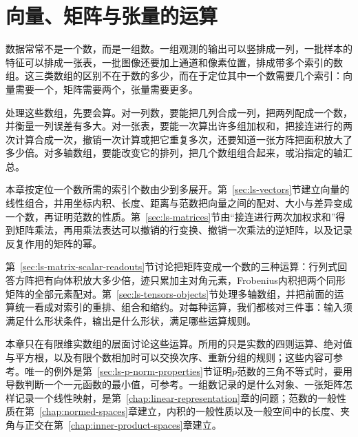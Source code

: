 \chapter{向量、矩阵与张量的运算}
\label{chap:linear-operations}

数据常常不是一个数，而是一组数。一组观测的输出可以竖排成一列，一批样本的特征可以排成一张表，一批图像还要加上通道和像素位置，排成带多个索引的数组。这三类数组的区别不在于数的多少，而在于定位其中一个数需要几个索引：向量需要一个，矩阵需要两个，张量需要更多。

处理这些数组，先要会算。对一列数，要能把几列合成一列，把两列配成一个数，并衡量一列误差有多大。对一张表，要能一次算出许多组加权和，把接连进行的两次计算合成一次，撤销一次计算或把它重复多次，还要知道一张方阵把面积放大了多少倍。对多轴数组，要能改变它的排列，把几个数组组合起来，或沿指定的轴汇总。

本章按定位一个数所需的索引个数由少到多展开。第~\ref{sec:ls-vectors}节建立向量的线性组合，并用坐标内积、长度、距离与范数把向量之间的配对、大小与差异变成一个数，再证明范数的性质。第~\ref{sec:ls-matrices}节由“接连进行两次加权求和”得到矩阵乘法，再用乘法表达可以撤销的行变换、撤销一次乘法的逆矩阵，以及记录反复作用的矩阵的幂。

第~\ref{sec:ls-matrix-scalar-readouts}节讨论把矩阵变成一个数的三种运算：行列式回答方阵把有向体积放大多少倍，迹只累加主对角元素，Frobenius内积把两个同形矩阵的全部元素配对。第~\ref{sec:ls-tensors-objects}节处理多轴数组，并把前面的运算统一看成对索引的重排、组合和缩约。对每种运算，我们都核对三件事：输入须满足什么形状条件，输出是什么形状，满足哪些运算规则。

本章只在有限维实数组的层面讨论这些运算。所用的只是实数的四则运算、绝对值与平方根，以及有限个数相加时可以交换次序、重新分组的规则；这些内容可参考。唯一的例外是第~\ref{sec:ls-p-norm-properties}节证明$p$范数的三角不等式时，要用导数判断一个一元函数的最小值，可参考。一组数记录的是什么对象、一张矩阵怎样记录一个线性映射，是第~\ref{chap:linear-representation}章的问题；范数的一般性质在第~\ref{chap:normed-spaces}章建立，内积的一般性质以及一般空间中的长度、夹角与正交在第~\ref{chap:inner-product-spaces}章建立。







